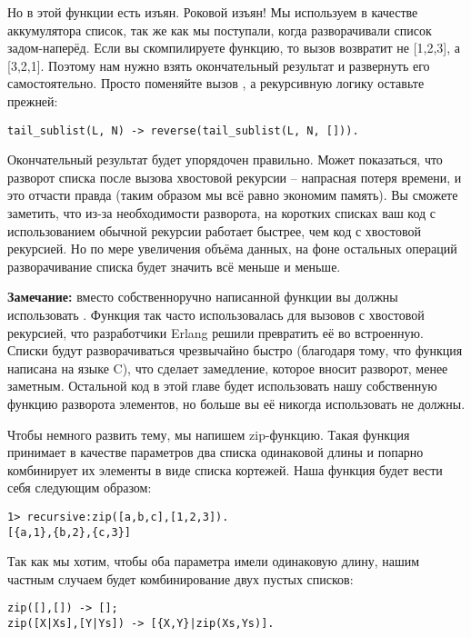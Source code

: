 Но в этой функции есть изъян.
Роковой изъян!
Мы используем в качестве аккумулятора список, так же как мы поступали, когда разворачивали список задом\--наперёд.
Если вы скомпилируете функцию, то вызов  возвратит не [1,2,3], а [3,2,1].
Поэтому нам нужно взять окончательный результат и развернуть его самостоятельно.
Просто поменяйте вызов , а рекурсивную логику оставьте прежней:
\begin{lstlisting}[style=erlang]
tail_sublist(L, N) -> reverse(tail_sublist(L, N, [])).
\end{lstlisting}

Окончательный результат будет упорядочен правильно.
Может показаться, что разворот списка после вызова хвостовой рекурсии \--- напрасная потеря времени, и это отчасти правда (таким образом мы всё равно экономим память).
Вы сможете заметить, что из\--за необходимости разворота, на коротких списках ваш код с использованием обычной рекурсии работает быстрее, чем код с хвостовой рекурсией.
Но по мере увеличения объёма данных, на фоне остальных операций разворачивание списка будет значить всё меньше и меньше.\\
\colorbox{lgray}
{
    \begin{minipage}{\linewidth}
\textbf{Замечание:} вместо собственноручно написанной функции  вы должны использовать .
Функция так часто использовалась для вызовов с хвостовой рекурсией, что разработчики Erlang решили превратить её во встроенную.
Списки будут разворачиваться чрезвычайно быстро (благодаря тому, что функция написана на языке C), что сделает замедление, которое вносит разворот, менее заметным.
Остальной код в этой главе будет использовать нашу собственную функцию разворота элементов, но больше вы её никогда использовать не должны.
    \end{minipage}
}

Чтобы немного развить тему, мы напишем zip\--функцию.
Такая функция принимает в качестве параметров два списка одинаковой длины и попарно комбинирует их элементы в виде списка кортежей.
Наша функция  будет вести себя следующим образом:
\begin{lstlisting}[style=erlang]
1> recursive:zip([a,b,c],[1,2,3]).
[{a,1},{b,2},{c,3}]
\end{lstlisting}

Так как мы хотим, чтобы оба параметра имели одинаковую длину, нашим частным случаем будет комбинирование двух пустых списков:
\begin{lstlisting}[style=erlang]
zip([],[]) -> [];
zip([X|Xs],[Y|Ys]) -> [{X,Y}|zip(Xs,Ys)].
\end{lstlisting}


